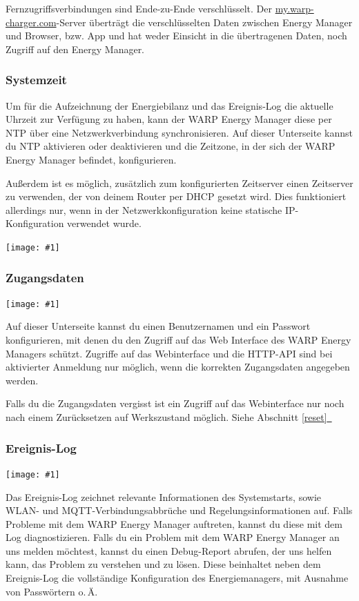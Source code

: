 \documentclass[a4paper,10pt]{article}
\newcommand{\hint}[1]{\begin{tcolorbox}[colback=boxgray,colframe=black,coltext=
white,title=Hinweis,left*=2mm,right*=2mm,boxsep=1mm,bottom=1mm,top=1mm]#1\end{tcolorbox}}
\newcommand{\gfx}[1]{\texttt{[image: \#1]}}
\newcommand*{\fullref}[1]{Abschnitt \hyperref[{#1}]{\ref*{#1}~\nameref*{#1}}}
\begin{document}
\begin{multicols*}{2}

    \hint{Fernzugriffsverbindungen sind Ende-zu-Ende verschlüsselt. Der \url{my.warp-charger.com}-Server überträgt die verschlüsselten Daten zwischen Energy Manager und Browser, bzw. App und hat weder Einsicht in die übertragenen Daten, noch Zugriff auf den Energy Manager.}


	\subsubsection{Systemzeit}\label{ntp}
	Um für die Aufzeichnung der Energiebilanz und das Ereignis-Log die aktuelle Uhrzeit zur
	Verfügung zu haben, kann der WARP Energy Manager diese per NTP über
	eine Netzwerkverbindung synchronisieren. Auf dieser Unterseite kannst du NTP aktivieren oder deaktivieren und die Zeitzone, in der sich der WARP Energy Manager befindet, konfigurieren.

	Außerdem ist es möglich, zusätzlich zum konfigurierten Zeitserver einen Zeitserver zu verwenden, der von deinem Router per DHCP gesetzt wird. Dies funktioniert allerdings nur,
	wenn in der Netzwerkkonfiguration keine statische IP-Konfiguration verwendet wurde.

	\gfx{./img/resized/web_ntp}


	\subsubsection{Zugangsdaten}

	\gfx{./img/resized/web_authentication.png}

	Auf dieser Unterseite kannst du einen Benutzernamen und ein Passwort konfigurieren, mit denen du den Zugriff auf das Web Interface
	des WARP Energy Managers schützt. Zugriffe auf das Webinterface und die HTTP-API sind bei aktivierter Anmeldung nur möglich, wenn
	die korrekten Zugangsdaten angegeben werden.
	\hint{Falls du die Zugangsdaten vergisst ist ein Zugriff auf das Webinterface nur noch nach einem Zurücksetzen auf Werkszustand möglich. Siehe \fullref{reset}}

	\subsubsection{Ereignis-Log}
	\gfx{./img/resized/web_event_log}

	Das Ereignis-Log zeichnet relevante Informationen des Systemstarts, sowie WLAN- und MQTT-Verbindungsabbrüche und Regelungsinformationen auf.
	Falls Probleme mit dem WARP Energy Manager auftreten, kannst du diese mit dem Log diagnostizieren.
	Falls du ein Problem mit dem WARP Energy Manager an uns melden möchtest, kannst du einen Debug-Report abrufen,
	der uns helfen kann, das Problem zu verstehen und zu lösen. Diese beinhaltet neben dem Ereignis-Log die vollständige
	Konfiguration des Energiemanagers, mit Ausnahme von Passwörtern o.\,Ä.


\end{multicols*}
\end{document}
